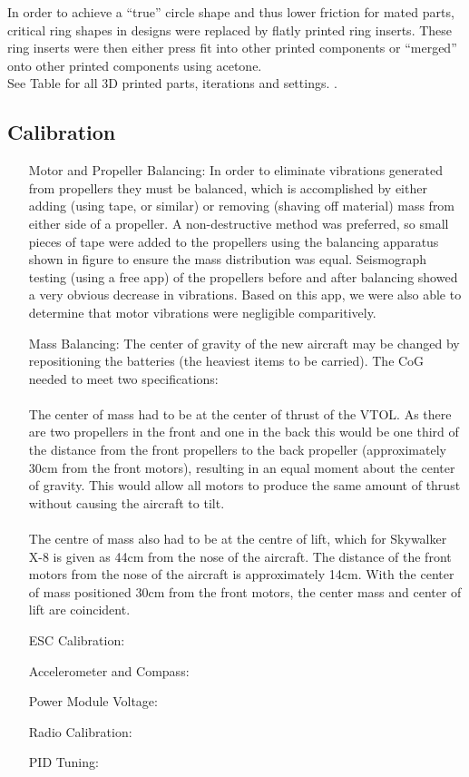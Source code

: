 In order to achieve a ``true'' circle shape and thus lower friction for mated parts, critical ring shapes in designs were replaced by flatly printed ring inserts. These ring inserts were then either press fit into other printed components or ``merged'' onto other printed components using acetone.\\

See Table \red{[REF]} for all 3D printed parts, iterations and settings.  .

	

\subsection{Calibration}
\begin{itemize}
	\item[Motor and Propeller Balancing:] In order to eliminate vibrations generated from propellers they must be balanced, which is accomplished by either adding (using tape, or similar) or removing (shaving off material) mass from either side of a propeller. A non-destructive method was preferred, so small pieces of tape were added to the propellers using the balancing apparatus shown in figure  to ensure the mass distribution was equal.  Seismograph testing (using a free app) of the propellers before and after balancing showed a very obvious decrease in vibrations. Based on this app, we were also able to determine that motor vibrations were negligible comparitively.
	\item[Mass Balancing:]  The center of gravity of the new aircraft may be changed by repositioning the batteries (the heaviest items to be carried). The CoG needed to meet two specifications:
	\\\\The center of mass had to be at the center of thrust of the VTOL. As there are two propellers in the front and one in the back this would be one third of the distance from the front propellers to the back propeller (approximately 30cm from the front motors), resulting in an equal moment about the center of gravity. This would allow all motors to produce the same amount of thrust without causing the aircraft to tilt.
	\\\\The centre of mass also had to be at the centre of lift, which for Skywalker X-8 is given as 44cm from the nose of the aircraft. The distance of the front motors from the nose of the aircraft is approximately 14cm. With the center of mass positioned 30cm from the front motors, the center mass and center of lift are coincident.
	\item[ESC Calibration:]
	\item[Accelerometer and Compass:]
	\item[Power Module Voltage:]
	\item[Radio Calibration:]
	\item[PID Tuning:]
		
\end{itemize}
